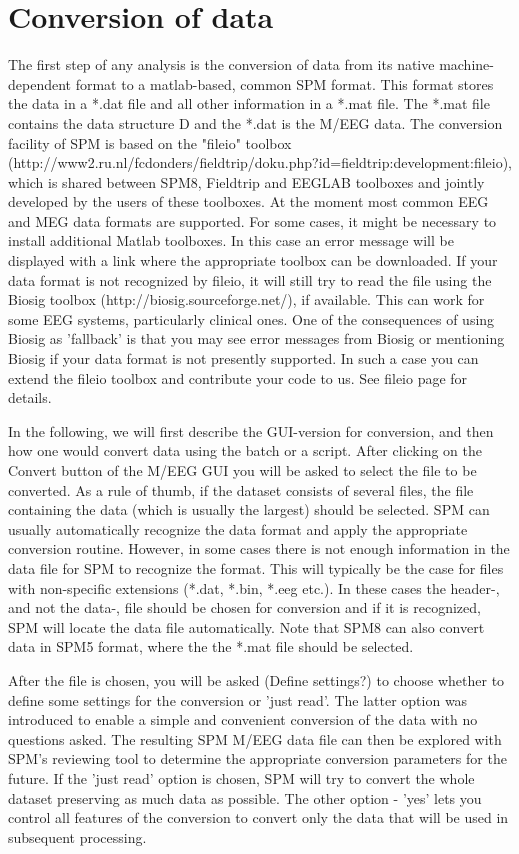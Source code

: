 \section{Conversion of data}
The first step of any analysis is the conversion of data from its
native machine-dependent format to a matlab-based, common SPM
format. This format stores the data in a *.dat file and all other
information in a *.mat file. The *.mat file contains the data
structure D and the *.dat is the M/EEG data. The conversion facility
of SPM is based on the "fileio" toolbox
(http://www2.ru.nl/fcdonders/fieldtrip/doku.php?id=fieldtrip:development:fileio),
which is shared between SPM8, Fieldtrip and EEGLAB toolboxes and
jointly developed by the users of these toolboxes. At the moment most
common EEG and MEG data formats are supported. For some cases, it
might be necessary to install additional Matlab toolboxes. In this
case an error message will be displayed with a link where the
appropriate toolbox can be downloaded. If your data format is not recognized
by fileio, it will still try to read the file using the Biosig toolbox 
(http://biosig.sourceforge.net/), if available. This can work for some
EEG systems, particularly clinical ones. One of the consequences of using Biosig as 'fallback'
is that you may see error messages from Biosig or mentioning Biosig if your data 
format is not presently supported. In such a case you can extend the fileio toolbox 
and contribute your code to us. See fileio page for details.

In the following, we will first describe the GUI-version for
conversion, and then how one would convert data using the batch or a
script. After clicking on the Convert button of the M/EEG GUI you will
be asked to select the file to be converted. As a rule of thumb, if the
dataset consists of several files, the file containing the data (which
is usually the largest) should be selected. SPM can usually
automatically recognize the data format and apply the appropriate
conversion routine. However, in some cases there is not enough
information in the data file for SPM to recognize the format. This
will typically be the case for files with non-specific extensions
(*.dat, *.bin, *.eeg etc.). In these cases the header-, and not the
data-, file should be chosen for conversion and if it is recognized,
SPM will locate the data file automatically. Note that SPM8 can also
convert data in SPM5 format, where the the *.mat file should be
selected.

After the file is chosen, you will be asked (Define settings?) to
choose whether to define some settings for the conversion or 'just
read'.  The latter option was introduced to enable a simple and
convenient conversion of the data with no questions asked. The
resulting SPM M/EEG data file can then be explored with SPM's reviewing tool to
determine the appropriate conversion parameters for the future. If
the 'just read' option is chosen, SPM will try to convert the whole
dataset preserving as much data as possible. The other option - 'yes'
lets you control all features of the conversion to convert only
the data that will be used in subsequent processing.

